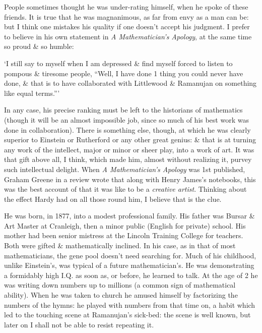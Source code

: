 \documentclass{article}
\numberwithin{equation}{section}
\begin{document}
People sometimes thought he was under-rating himself, when he spoke of these friends. It is true that he was magnanimous, as far from envy as a man can be: but I think one mistakes his quality if one doesn't accept his judgment. I prefer to believe in his own statement in \textit{A Mathematician's Apology}, at the same time so proud \& so humble:

`I still say to myself when I am depressed \& find myself forced to listen to pompous \& tiresome people, ``Well, I have done 1 thing you could never have done, \& that is to have collaborated with Littlewood \& Ramanujan on something like equal terms.'''

In any case, his precise ranking must be left to the historians of mathematics (though it will be an almost impossible job, since so much of his best work was done in collaboration). There is something else, though, at which he was clearly superior to Einstein or Rutherford or any other great genius: \& that is at turning any work of the intellect, major or minor or sheer play, into a work of art. It was that gift above all, I think, which made him, almost without realizing it, purvey such intellectual delight. When \textit{A Mathematician's Apology} was 1st published, Graham Greene in a review wrote that along with Henry James's notebooks, this was the best account of that it was like to be a \textit{creative artist}. Thinking about the effect Hardy had on all those round him, I believe that is the clue.

He was born, in 1877, into a modest professional family. His father was Bursar \& Art Master at Cranleigh, then a minor public (English for private) school. His mother had been senior mistress at the Lincoln Training College for teachers. Both were gifted \& mathematically inclined. In his case, as in that of most mathematicians, the gene pool doesn't need searching for. Much of his childhood, unlike Einstein's, was typical of a future mathematician's. He was demonstrating a formidably high I.Q. as soon as, or before, he learned to talk. At the age of 2 he was writing down numbers up to millions (a common sign of mathematical ability). When he was taken to church he amused himself by factorizing the numbers of the hymns: he played with numbers from that time on, a habit which led to the touching scene at Ramanujan's sick-bed: the scene is well known, but later on I shall not be able to resist repeating it.
\end{document}
